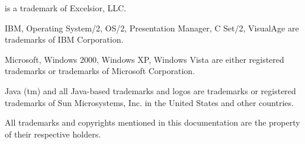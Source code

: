 \begin{titlepage}
{\XDS{} is a trademark of Excelsior, LLC. %

\ifcommon \else %
  \ifosii
    IBM, Operating System/2, OS/2, Presentation Manager, C Set/2, VisualAge
    are trademarks of IBM Corporation.
  \fi

  \ifwinnt
    Microsoft, Windows 2000, Windows XP, Windows Vista are
    either registered trademarks or trademarks of Microsoft Corporation.
  \fi
\fi

\ifjava
  Java (tm) and all Java-based trademarks and logos are trademarks or
  registered trademarks of Sun Microsystems, Inc. in the United States and
  other countries. 
\fi

All trademarks and copyrights mentioned in this documentation are
the property of their respective holders.

} %
\end{titlepage}

